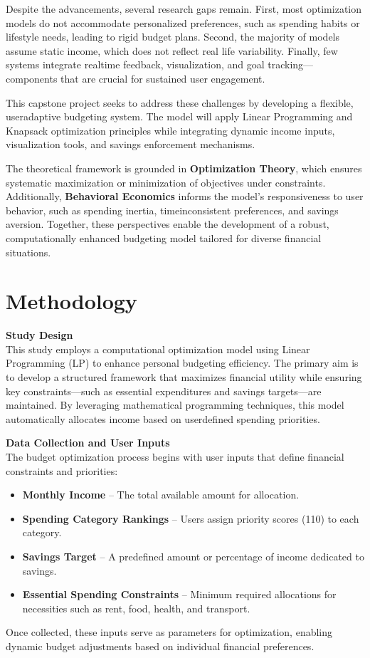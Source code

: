 \documentclass{article}
\begin{document}
Despite the advancements, several research gaps remain. First, most optimization models do not accommodate personalized preferences, such as spending habits or lifestyle needs, leading to rigid budget plans. Second, the majority of models assume static income, which does not reflect real life variability. Finally, few systems integrate realtime feedback, visualization, and goal tracking—components that are crucial for sustained user engagement.

This capstone project seeks to address these challenges by developing a flexible, useradaptive budgeting system. The model will apply Linear Programming and Knapsack optimization principles while integrating dynamic income inputs, visualization tools, and savings enforcement mechanisms.

The theoretical framework is grounded in \textbf{Optimization Theory}, which ensures systematic maximization or minimization of objectives under constraints. Additionally, \textbf{Behavioral Economics} informs the model's responsiveness to user behavior, such as spending inertia, timeinconsistent preferences, and savings aversion. Together, these perspectives enable the development of a robust, computationally enhanced budgeting model tailored for diverse financial situations.


\section{Methodology}

\textbf{Study Design} \\
This study employs a computational optimization model using Linear Programming (LP) to enhance personal budgeting efficiency. The primary aim is to develop a structured framework that maximizes financial utility while ensuring key constraints—such as essential expenditures and savings targets—are maintained. By leveraging mathematical programming techniques, this model automatically allocates income based on userdefined spending priorities.

\textbf{Data Collection and User Inputs} \\
The budget optimization process begins with user inputs that define financial constraints and priorities:
\begin{itemize}
    \item \textbf{Monthly Income} – The total available amount for allocation.
    \item \textbf{Spending Category Rankings} – Users assign priority scores (110) to each category.
    \item \textbf{Savings Target} – A predefined amount or percentage of income dedicated to savings.
    \item \textbf{Essential Spending Constraints} – Minimum required allocations for necessities such as rent, food, health, and transport.
\end{itemize}
Once collected, these inputs serve as parameters for optimization, enabling dynamic budget adjustments based on individual financial preferences.
\end{document}
